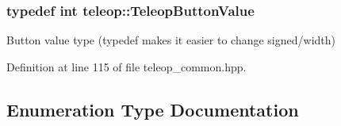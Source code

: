 \subsubsection[{TeleopButtonValue}]{\setlength{\rightskip}{0pt plus 5cm}typedef int {\bf teleop::TeleopButtonValue}}\label{namespaceteleop_ac4714f8484c4ca73ffa50a497ae50032}
Button value type (typedef makes it easier to change signed/width) 

Definition at line 115 of file teleop\_\-common.hpp.



\subsection{Enumeration Type Documentation}
